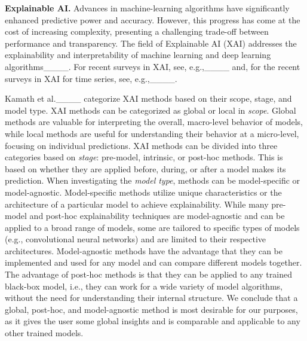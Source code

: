 \noindent
\textbf{Explainable AI.}
Advances in machine-learning algorithms have significantly enhanced predictive power and accuracy. However, this progress has come at the cost of increasing complexity, presenting a challenging trade-off between performance and transparency. The field of Explainable AI (XAI) addresses the explainability and interpretability of machine learning and deep learning algorithms____.
For recent surveys in XAI, see, e.g.,____ and, for the recent surveys in XAI for time series, see, e.g.,____.

Kamath et al.____ categorize XAI methods based on their scope, stage, and model type. 
%
XAI methods can be categorized as global or local in \textit{scope}. Global methods are valuable for interpreting the overall, macro-level behavior of models, while local methods are useful for understanding their behavior at a micro-level, focusing on individual predictions.
%
XAI methods can be divided into three categories based on \textit{stage}: pre-model, intrinsic, or post-hoc methods. This is based on whether they are applied before, during, or after a model makes its prediction. 
When investigating the \textit{model type}, methods can be model-specific or model-agnostic. Model-specific methods utilize unique characteristics or the architecture of a particular model to achieve explainability. While many pre-model and post-hoc explainability techniques are model-agnostic and can be applied to a broad range of models, some are tailored to specific types of models (e.g., convolutional neural networks) and are limited to their respective architectures.
Model-agnostic methods have the advantage that they can be implemented and used for any model and can compare different models together. The advantage of post-hoc methods is that they can be applied to any trained black-box model, i.e., they can work for a wide variety of model algorithms, without the need for understanding their internal structure.
We conclude that a global, post-hoc, and model-agnostic method is most desirable for our purposes, as it gives the user some global insights and is comparable and applicable to any other trained models. 

